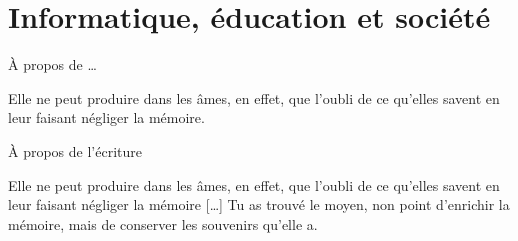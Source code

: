 
\section{Informatique, éducation et société}

\begin{frame}{À propos de \ldots}
\begin{coolquote}
Elle ne peut produire dans les âmes, en effet, que l’oubli de ce qu’elles savent en leur faisant négliger la mémoire.
\end{coolquote}
\end{frame}
\begin{frame}{À propos de l'écriture}
\begin{coolquote}
Elle ne peut produire dans les âmes, en effet, que l’oubli de ce qu’elles savent en leur faisant négliger la mémoire [\ldots] Tu as trouvé le moyen, non point d’enrichir la mémoire, mais de conserver les souvenirs qu’elle a.
\end{coolquote}
\end{frame}
